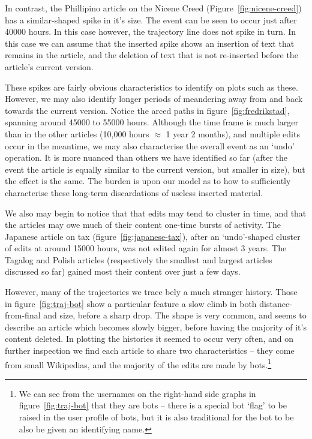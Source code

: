 In contrast, the Phillipino article on the Nicene Creed
(Figure~\ref{fig:nicene-creed}) has a similar-shaped spike in it's
size. The event can be seen to occur just after 40000 hours. In this
case however, the trajectory line does not spike in turn. In this case
we can assume that the inserted spike shows an insertion of text that
remains in the article, and the deletion of text that is not
re-inserted before the article's current version.

These spikes are fairly obvious characteristics to identify on plots
such as these. However, we may also identify longer periods of
meandering away from and back towards the current version. Notice the
arced paths in figure~\ref{fig:fredrikstad}, spanning around 45000 to
55000 hours. Although the time frame is much larger than in the other
articles (10,000 hours $\approx$ 1 year 2 months), and multiple edits
occur in the meantime, we may also characterise the overall event as
an `undo' operation. It is more nuanced than others we have identified
so far (after the event the article is equally similar to the current
version, but smaller in size), but the effect is the same. The burden
is upon our model as to how to sufficiently characterise these
long-term discardations of useless inserted material.

We also may begin to notice that that edits may tend to cluster in
time, and that the articles may owe much of their content one-time
bursts of activity. The Japanese article on tax
(figure~\ref{fig:japanese-tax}), after an `undo'-shaped cluster of
edits at around 15000 hours, was not edited again for almost 3
years. The Tagalog and Polish articles (respectively the smallest and
largest articles discussed so far) gained most their content over just
a few days. 

However, many of the trajectories we trace bely a much stranger
history. Those in figure~\ref{fig:traj-bot} show a particular feature
a slow climb in both distance-from-final and size, before a sharp
drop. The shape is very common, and seems to describe an article which
becomes slowly bigger, before having the majority of it's content
deleted. In plotting the histories it seemed to occur very often, and
on further inspection we find each article to share two
characteristics -- they come from small Wikipedias, and the majority
of the edits are made by bots.\footnote{We can see from the usernames on the
right-hand side graphs in figure~\ref{fig:traj-bot} that they are bots
-- there is a special bot `flag' to be raised in the user profile of
bots, but it is also traditional for the bot to be also be given an
identifying name.\cite{wiki-bot-policy}}
 
